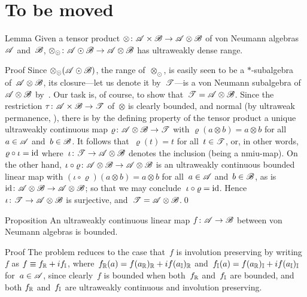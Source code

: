 \documentclass[a]{subfiles}
\begin{document}
\section{To be moved}
\begin{parsec}%
\begin{point}{Lemma}%
Given a tensor product  $\otimes \colon \mathscr{A}\times \mathscr{B}\to\mathscr{A}\otimes \mathscr{B}$
of von Neumann algebras~$\mathscr{A}$ and~$\mathscr{B}$,
$\otimes_\odot\colon \mathscr{A}\odot\mathscr{B}\to \mathscr{A}\otimes \mathscr{B}$
has ultraweakly dense range.
\begin{point}{Proof}%
Since
$\otimes_\odot(\mathscr{A}\odot \mathscr{B})$,
the range of~$\otimes_\odot$,
is easily seen to be a $*$-subalgebra
of~$\mathscr{A}\otimes \mathscr{B}$,
its closure---let us denote it by~$\mathscr{T}$---is a
von Neumann subalgebra of~$\mathscr{A}\otimes \mathscr{B}$
by~\TODO{}.
Our task is, of course, to show that~$\mathscr{T}=\mathscr{A}\otimes \mathscr{B}$.
Since the restriction $\tau\colon \mathscr{A}\times\mathscr{B}\to 
\mathscr{T}$ of~$\otimes$ is clearly bounded,
and normal (by ultraweak permanence, ),
there is by the defining property of the tensor product
a unique ultraweakly continuous map 
$\varrho\colon \mathscr{A}\otimes \mathscr{B}\to\mathscr{T}$
with $\varrho(a\otimes b)= a\otimes b$ for all~$a\in\mathscr{A}$
and~$b\in \mathscr{B}$.
It follows that~$\varrho(t)=t$ for all~$t\in \mathscr{T}$,
or, in other words, $\varrho\circ \iota = \operatorname{id}$
where~$\iota\colon \mathscr{T}\to\mathscr{A}\otimes \mathscr{B}$
denotes the inclusion (being a nmiu-map).
On the other hand,
$\iota\circ \varrho\colon \mathscr{A}\otimes \mathscr{B}\to\mathscr{A}\otimes \mathscr{B}$
is an ultraweakly continuous bounded
linear map with $(\iota\circ \varrho)(a\otimes b)=a\otimes b$
for all~$a\in\mathscr{A}$ and~$b\in\mathscr{B}$,
as is~$\operatorname{id}\colon \mathscr{A}\otimes \mathscr{B}\to\mathscr{A}\otimes\mathscr{B}$;
so that we may conclude~$\iota\circ \varrho=\operatorname{id}$.
Hence~$\iota\colon \mathscr{T}\to\mathscr{A}\otimes\mathscr{B}$
is surjective, and~$\mathscr{T}=\mathscr{A}\otimes \mathscr{B}$.\qed
\end{point}
\end{point}
\begin{point}{Proposition}%
An ultraweakly continuous linear map $f\colon \mathscr{A}\to\mathscr{B}$
between von Neumann algebras is bounded.
\begin{point}{Proof}%
The problem reduces to the case that~$f$ is involution preserving
by writing~$f$ as
$f\equiv f_{\mathbb{R}}+if_{\mathbb{I}}$,
where~$f_{\mathbb{R}}(a)=f(a_{\mathbb{R}})_{\mathbb{R}}
+ if(a_{\mathbb{I}})_{\mathbb{R}}$
and~$f_{\mathbb{I}}(a)=f(a_{\mathbb{R}})_{\mathbb{I}}+if(a_{\mathbb{I}})_{\mathbb{I}}$
for~$a\in\mathscr{A}$,
since clearly~$f$ is bounded when both~$f_{\mathbb{R}}$ and~$f_{\mathbb{I}}$
are bounded,
and both $f_{\mathbb{R}}$ and~$f_{\mathbb{I}}$ 
are ultraweakly continuous and involution preserving.


\end{point}
\end{point}
\end{parsec}
\end{document}
